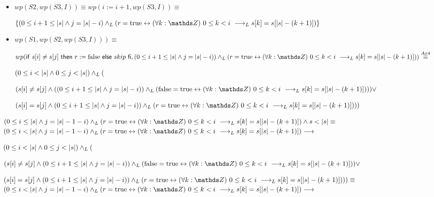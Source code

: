 \documentclass{article}
\begin{document}
\begin{itemize}
\begin{itemize}
        \item $wp(S2,wp(S3, I))\equiv wp(i:= i+1,wp(S3, I)) \equiv$

        $ \{ (0 \leq i+1 \leq \longitud{s} \wedge j = \longitud{s}-i) \yLuego (r = \True \Iff \paraTodo{k}{0}{i} \implicaLuego s[k]=s[\longitud{s}-(k+1)]) \} $

        \item $wp(S1,wp(S2,wp(S3,I))) \equiv $

        $ wp(\IfThenElse{s[i] \neq s[j]}{r:=\False}{skip},(0 \leq i+1 \leq \longitud{s} \wedge j = \longitud{s}-i)) \yLuego (r = \True \Iff \paraTodo{k}{0}{i} \implicaLuego s[k]=s[\longitud{s}-(k+1)])) \stackrel{Ax4}{\equiv} $

        $ (0 \leq i < |s| \wedge 0 \leq j < |s|) \land _L ($

        $ ( s[i] \neq s[j] \wedge ((0 \leq i+1 \leq \longitud{s} \wedge j = \longitud{s}-i)) \yLuego (\False = \True \Iff \paraTodo{k}{0}{i} \implicaLuego s[k]=s[\longitud{s}-(k+1)]))) \vee$

        $ ( s[i]   =  s[j] \wedge (0 \leq i+1 \leq \longitud{s} \wedge j = \longitud{s}-i)) \yLuego (r = \True \Iff \paraTodo{k}{0}{i} \implicaLuego s[k]=s[\longitud{s}-(k+1)])))$
    \end{itemize}

    $ (0 \leq i \leq \longitud{s} \wedge j = \longitud{s}-1-i) \yLuego (r = \True \Iff \paraTodo{k}{0}{i} \implicaLuego s[k]=s[\longitud{s}-(k+1)]) \wedge s < \longitud{s} \equiv $ \\

    $ (0 \leq i < \longitud{s} \wedge j = \longitud{s}-1-i) \yLuego (r = \True \Iff \paraTodo{k}{0}{i} \implicaLuego s[k]=s[\longitud{s}-(k+1)]) \implica $

    $ (0 \leq i < |s| \wedge 0 \leq j < |s|) \land _L ($

    $ ( s[i] \neq s[j] \wedge (0 \leq i+1 \leq \longitud{s} \wedge j = \longitud{s}-i)) \yLuego (\False = \True \Iff \paraTodo{k}{0}{i} \implicaLuego s[k]=s[\longitud{s}-(k+1)])) \vee$

    $ ( s[i]   =  s[j] \wedge (0 \leq i+1 \leq \longitud{s} \wedge j = \longitud{s}-i)) \yLuego (r = \True \Iff \paraTodo{k}{0}{i} \implicaLuego s[k]=s[\longitud{s}-(k+1)])))\equiv$ \\

    $ (0 \leq i < \longitud{s} \wedge j = \longitud{s}-1-i) \yLuego (r = \True \Iff \paraTodo{k}{0}{i} \implicaLuego s[k]=s[\longitud{s}-(k+1)]) \implica $


\end{itemize}
\end{document}
